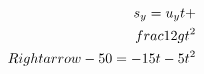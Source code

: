 \documentclass[preview]{standalone}
\begin{document}
\begin{align*}
\special{dvisvgm:raw <g id='unique000'>}s_y = u_y t + \\frac{1}{2} g t^2 \\Rightarrow -50 = -15 t - 5 t^2\special{dvisvgm:raw </g>}
\end{align*}
\end{document}
